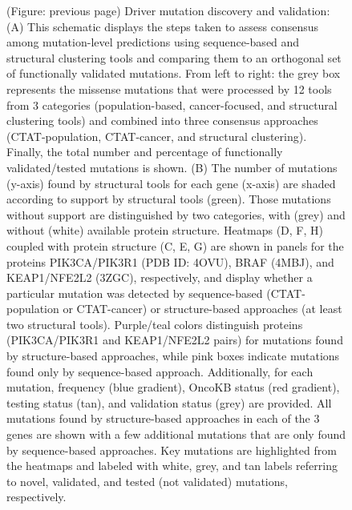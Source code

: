\begin{figure} [t!]
  \caption[(continued) Driver mutation discovery and validation]{(Figure: previous page) Driver mutation discovery and validation: (A) This schematic displays the steps taken to assess consensus among mutation-level predictions using sequence-based and structural clustering tools and comparing them to an orthogonal set of functionally validated mutations. From left to right: the grey box represents the missense mutations that were processed by 12 tools from 3 categories (population-based, cancer-focused, and structural clustering tools) and combined into three consensus approaches (CTAT-population, CTAT-cancer, and structural clustering). Finally, the total number and percentage of functionally validated/tested mutations is shown. (B) The number of mutations (y-axis) found by structural tools for each gene (x-axis) are shaded according to support by structural tools (green). Those mutations without support are distinguished by two categories, with (grey) and without (white) available protein structure.  Heatmaps (D, F, H) coupled with protein structure (C, E, G) are shown in panels for the proteins PIK3CA/PIK3R1 (PDB ID: 4OVU), BRAF (4MBJ), and KEAP1/NFE2L2 (3ZGC), respectively, and display whether a particular mutation was detected by sequence-based (CTAT-population or CTAT-cancer) or structure-based approaches (at least two structural tools). Purple/teal colors distinguish proteins (PIK3CA/PIK3R1 and KEAP1/NFE2L2 pairs) for mutations found by structure-based approaches, while pink boxes indicate mutations found only by sequence-based approach. Additionally, for each mutation, frequency (blue gradient), OncoKB status (red gradient), testing status (tan), and validation status (grey) are provided. All mutations found by structure-based approaches in each of the 3 genes are shown with a few additional mutations that are only found by sequence-based approaches. Key mutations are highlighted from the heatmaps and labeled with white, grey, and tan labels referring to novel, validated, and tested (not validated) mutations, respectively.}
\end{figure}

